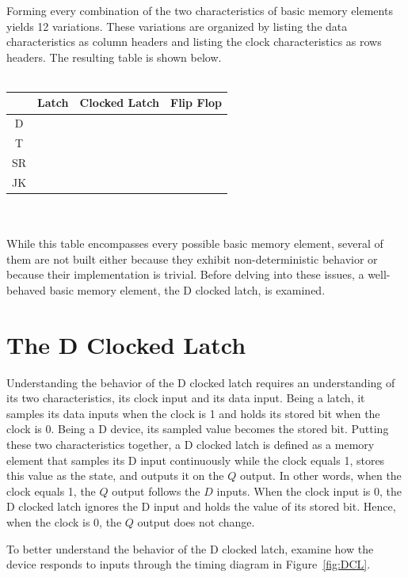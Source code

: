 Forming every combination of the two characteristics of basic
memory elements yields 12 variations.  These variations are
organized by listing the data characteristics as column 
headers and listing the clock characteristics as rows headers.
The resulting table is shown below.
\\ \\
\begin{tabular}{|c|c|c|c|}\hline
   &  Latch & Clocked Latch  & Flip Flop   \\ \hline
D  &        &	  &	\\ \hline
T  &        &     &	\\ \hline
SR &	    &	  &	\\ \hline
JK &        &     &	\\ \hline
\end{tabular}
\\ \\
While this table encompasses every possible basic memory 
element, several of them are not built either because they
exhibit non-deterministic behavior or because their implementation
is trivial.  Before delving into these issues, a well-behaved basic memory 
element, the D clocked latch, is examined.


\section{The D Clocked Latch}
Understanding the behavior of the D clocked latch requires
an understanding of its two characteristics, its clock
input and its data input.  Being a latch, it samples its
data inputs when the clock is 1 and holds its stored bit
when the clock is 0.  Being a D device, its sampled value
becomes the stored bit. Putting these two characteristics 
together, a D clocked latch is defined as a memory
element that samples its D input continuously while the clock 
equals 1, stores this value as the state, and outputs it on 
the $Q$ output.  In other words, when the clock equals 1, the
$Q$ output follows the $D$ inputs. When the clock input is 0, 
the D clocked latch ignores the D input and holds the value 
of its stored bit.  Hence, when the clock is 0, the
$Q$ output does not change.

To better understand the behavior of the D clocked latch, 
examine how the device responds to inputs through 
the timing diagram in Figure~\ref{fig:DCL}.

